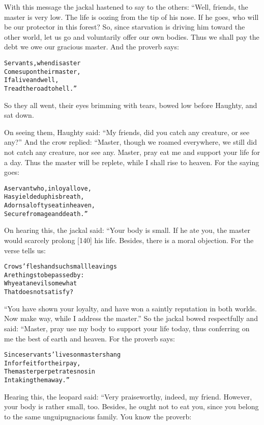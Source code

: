 \documentclass{article}
\renewenvironment{verbatim}{\begin{alltt}\normalfont\begin{centering}}{\end{centering}\end{alltt}}
\begin{document}
With this message the jackal hastened to say to the others: “Well,
friends, the master is very low. The life is oozing from the tip of
his nose. If he goes, who will be our protector in this forest? So,
since starvation is driving him toward the other world, let us go
and voluntarily offer our own bodies. Thus we shall pay the debt we
owe our gracious master. And the proverb says:

\begin{verbatim}
Servants, when disaster
Comes upon their master,
If alive and well,
Tread the road to hell.”
\end{verbatim}
So they all went, their eyes brimming with tears, bowed low before
Haughty, and sat down.

On seeing them, Haughty said:
``My friends, did you catch any creature, or see any?'' And the
crow replied: “Master, though we roamed everywhere, we still did
not catch any creature, nor see any. Master, pray eat me and
support your life for a day. Thus the master will be replete, while
I shall rise to heaven. For the saying goes:

\begin{verbatim}
A servant who, in loyal love,
Has yielded up his breath,
Adorns a lofty seat in heaven,
Secure from age and death.”
\end{verbatim}
On hearing this, the jackal said: “Your body is small. If he ate
you, the master would scarcely prolong [140] his life. Besides,
there is a moral objection. For the verse tells us:

\begin{verbatim}
Crows' flesh and such small leavings
    Are things to be passed by:
Why eat an evil somewhat
    That does not satisfy?
\end{verbatim}
``You have shown your loyalty, and have won a saintly reputation in both worlds. Now make way, while I address the master.''
So the jackal bowed respectfully and said: “Master, pray use my
body to support your life today, thus conferring on me the best of
earth and heaven. For the proverb says:

\begin{verbatim}
Since servants' lives on masters hang
    In forfeit for their pay,
The master perpetrates no sin
    In taking them away.”
\end{verbatim}
Hearing this, the leopard said: “Very praiseworthy, indeed, my
friend. However, your body is rather small, too. Besides, he ought
not to eat you, since you belong to the same unguipugnacious
family. You know the proverb:
\end{document}
